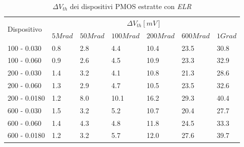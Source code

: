 \documentclass[
	a4paper,
	cleardoublepage=empty,
	headings=twolinechapter,
	numbers=autoenddot,
]{scrbook}
\begin{document}
\begin{table}[H]
  \renewcommand{\arraystretch}{1.3}
  \begin{tabular}{m{2.1cm}  m{1.1cm} m{1.3cm} m{1.5cm} m{1.5cm} m{1.5cm} m{1cm}}
    \toprule
    \multirow{2}{*}{Dispositivo} & \multicolumn{6}{c}{$\Delta V_{th} [mV] $}                                                          \\
    \cmidrule{2-7}
                                 & $5Mrad$                                   & $50Mrad$ & $100Mrad$ & $200Mrad$ & $600Mrad$ & $1Grad$ \\
    \midrule
    100 - 0.030                     & 0.8                                       & 2.8      & 4.4       & 10.4      & 23.5      & 30.8    \\
    \hline
    100 - 0.060                     & 0.9                                       & 2.6      & 4.5       & 10.9      & 23.3      & 32.9    \\
    \hline
    200 - 0.030                     & 1.4                                       & 3.2      & 4.1       & 10.8      & 21.3      & 28.6    \\
    \hline
    200 - 0.060                     & 1.3                                       & 2.9      & 4.7       & 10.5      & 23.5      & 32.6    \\
    \hline
    200 - 0.0180                    & 1.2                                       & 8.0      & 10.1      & 16.2      & 29.3      & 40.4    \\
    \hline
    600 - 0.030                     & 1.5                                       & 3.2      & 5.2       & 10.7      & 20.4      & 27.7    \\
    \hline
    600 - 0.060                     & 1.4                                       & 4.3      & 4.8       & 11.8      & 24.5      & 33.3    \\
    \hline
    600 - 0.0180                    & 1.2                                       & 3.2      & 5.7       & 12.0      & 27.6      & 39.7    \\
    \bottomrule
  \end{tabular}
  \caption{$\Delta V_{th}$ dei dispositivi PMOS estratte con \emph{ELR}}
  \label{tab:deltaVthELRP}
\end{table}
\end{document}
